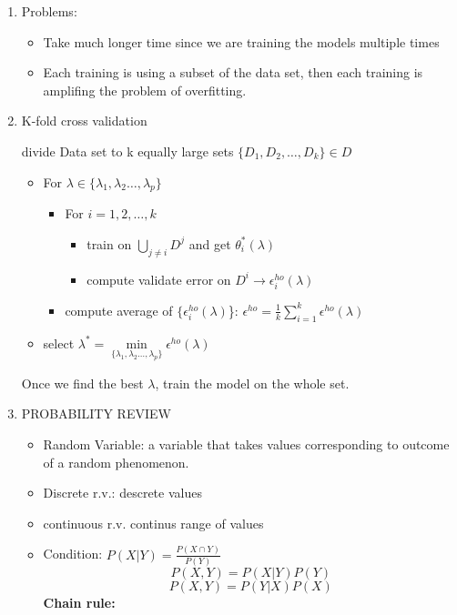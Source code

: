 \documentclass[12pt]{article}
\begin{document}
\begin{multicols}{2}
\begin{enumerate}
            \item Problems:
            \begin{itemize}
                \item Take much longer time since we are training the models multiple times
                \item Each training is using a subset of the data set, then each training is amplifing the problem of overfitting.
            \end{itemize}

            \item K-fold cross validation
            
            divide Data set to k equally large sets $\{D_1, D_2, \dots, D_k\} \in D$

            \begin{itemize}
                \item For $\lambda \in \{\lambda_1, \lambda_2 \dots, \lambda_p\}$
                \begin{itemize}
                    \item For $i = 1,2, \dots, k$
                    \begin{itemize}
                        \item train on $\bigcup\limits_{j\ne i}D^j$ and get $\theta_i^*(\lambda)$
                        \item compute validate error on $D^i \rightarrow \epsilon^{ho}_i(\lambda)$
                    \end{itemize}
                    \item compute average of $\{\epsilon_i^{ho}(\lambda)$\}: $\epsilon^{ho} = \frac{1}{k}\sum_{i = 1}^{k}\epsilon^{ho}(\lambda)$
                \end{itemize}
                \item select $\lambda^* = \min\limits_{\{\lambda_1, \lambda_2 \dots, \lambda_p\}}\epsilon^{ho}(\lambda)$
            \end{itemize}

            Once we find the best $\lambda$, train the model on the whole set.

            \item PROBABILITY REVIEW
            \begin{itemize}
                \item Random Variable: a variable that takes values corresponding to outcome of a random phenomenon.
                \item Discrete r.v.: descrete values
                \item continuous r.v. continus range of values
                \item Condition: $P(X|Y) = \frac{P(X \cap Y)}{P(Y)}$
                $$P(X,Y) = P(X|Y)P(Y)$$
                $$P(X,Y) = P(Y|X)P(X)$$
                \textbf{Chain rule:} 
                

\end{itemize}
\end{enumerate}
\end{multicols}
\end{document}
